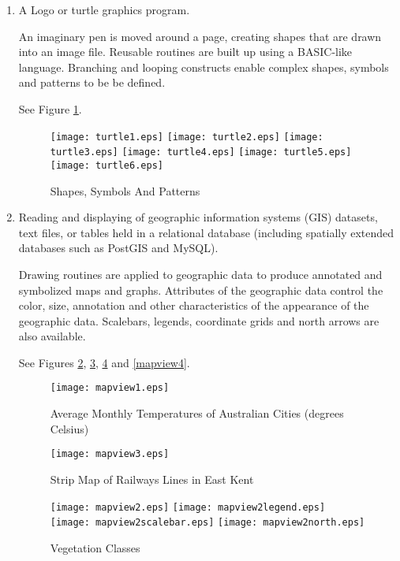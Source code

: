 \begin{enumerate}
\item

A Logo or turtle graphics program.

An imaginary pen is moved around a page,
creating shapes that are drawn into an image file.
Reusable routines are built up using a BASIC-like language.
Branching and looping constructs enable complex shapes, symbols and patterns
to be be defined.

See Figure \ref{turtle}.

\begin{figure}[htb]
\texttt{[image: turtle1.eps]}
\texttt{[image: turtle2.eps]}
\texttt{[image: turtle3.eps]}
\texttt{[image: turtle4.eps]}
\texttt{[image: turtle5.eps]}
\texttt{[image: turtle6.eps]}
\caption{Shapes, Symbols And Patterns}
\label{turtle}
\end{figure}

\item

Reading and displaying of geographic information
systems (GIS) datasets, text files, or tables held in a relational database
(including spatially extended databases such as PostGIS and MySQL).

Drawing routines are applied to geographic data to produce annotated and
symbolized maps and graphs.  Attributes of the geographic data control
the color, size, annotation and other characteristics of the
appearance of the geographic data.
Scalebars, legends, coordinate grids and north arrows are also available.

See Figures \ref{mapview1}, \ref{mapview3}, \ref{mapview2} and
\ref{mapview4}.

\begin{figure}
\texttt{[image: mapview1.eps]}
\caption[Average Monthly Temperatures]{Average Monthly Temperatures of Australian Cities (degrees Celsius)}
\label{mapview1}
\end{figure}

\begin{figure}
\texttt{[image: mapview3.eps]}
\caption{Strip Map of Railways Lines in East Kent}
\label{mapview3}
\end{figure}

\begin{figure}

\texttt{[image: mapview2.eps]}
\texttt{[image: mapview2legend.eps]}
\vspace{1pt}
\texttt{[image: mapview2scalebar.eps]}
\texttt{[image: mapview2north.eps]}
\caption{Vegetation Classes}
\label{mapview2}
\end{figure}


\end{enumerate}
